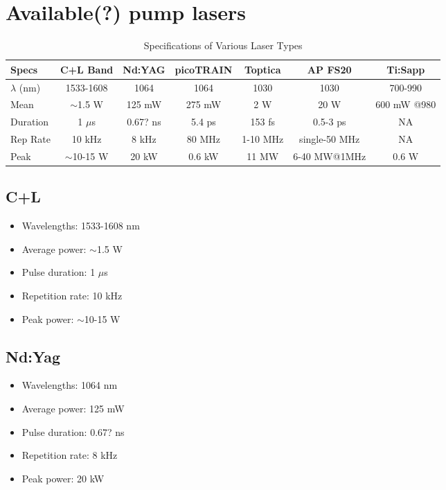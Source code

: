 \documentclass[11pt, headings=optiontoheadandtoc]{article}
\begin{document}
\section{Available(?) pump lasers}

\begin{table}[h]
\centering
\begin{tabular}{|l|c|c|c|c|c|c|}
\hline
\textbf{Specs}    & \textbf{C+L Band}       & \textbf{Nd:YAG}  & \textbf{picoTRAIN}    & \textbf{Toptica}    & \textbf{AP FS20}      & \textbf{Ti:Sapp}         \\ \hline
$\lambda$ (nm)          & 1533-1608               & 1064             & 1064                  & 1030                     & 1030                         & 700-990                     \\ \hline
Mean          & $\sim$1.5 W               & 125 mW           & 275 mW                & 2 W                        & 20 W                           & 600 mW @980       \\ \hline
Duration            & 1 $\mu$s                & 0.67? ns          & 5.4 ps                & 153 fs                   & 0.5-3 ps                     & NA                          \\ \hline
Rep Rate           & 10 kHz                  & 8 kHz            & 80 MHz                & 1-10 MHz                 & single-50 MHz           & NA                          \\ \hline
Peak             & $\sim$10-15 W           & 20 kW            & 0.6 kW                & 11 MW                    & 6-40 MW@1MHz        & 0.6 W                       \\ \hline
\end{tabular}
\caption{Specifications of Various Laser Types}
\label{tab:lasers}
\end{table}


\subsection*{C+L}
\begin{itemize}
    \item Wavelengths: 1533-1608 nm
    \item Average power: $\sim$1.5 W
    \item Pulse duration: 1 $\mu$s
    \item Repetition rate: 10 kHz
    \item Peak power: $\sim$10-15 W
\end{itemize}
\subsection*{Nd:Yag}
\begin{itemize}
    \item Wavelengths: 1064 nm
    \item Average power: 125 mW
    \item Pulse duration: 0.67? ns
    \item Repetition rate: 8 kHz
    \item Peak power: 20 kW
\end{itemize}
\end{document}
